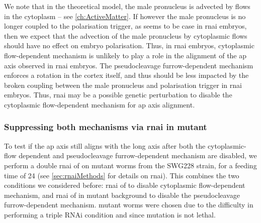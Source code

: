 We note that in the theoretical model, the male pronucleus is advected by flows in the cytoplasm -- see \autoref{ch:ActiveMatter}. If however the male pronucleus is no longer coupled to the polarisation trigger, as seems to be case in  \ac{rnai} embryos, then we expect that the advection of the male pronucleus by cytoplasmic flows should have no effect on embryo polarisation. Thus, in  \ac{rnai} embryos, cytoplasmic flow-dependent mechanism is unlikely to play a role in the alignment of the \ac{ap} axis observed in  \ac{rnai} embryos. The pseudocleavage furrow-dependent mechanism enforces a rotation in the cortex itself, and thus should be less impacted by the broken coupling between the male pronucleus and polarisation trigger in 
\ac{rnai} embryos. Thus,  \ac{rnai} may be a possible genetic perturbation to disable the cytoplasmic flow-dependent mechanism for \ac{ap} axis alignment.



\subsubsection{Suppressing both mechanisms via  \ac{rnai} in  mutant}
To test if the \ac{ap} axis still aligns with the long axis after both the cytoplasmic-flow dependent and pseudocleavage furrow-dependent mechanism are disabled, we perform a double \ac{rnai} of  on  mutant worms from the SWG228 strain, for a feeding time of \SI{24}{\unitRNAiTime} (see \autoref{sec:rnaiMethods} for details on \ac{rnai}). This combines the two conditions we considered before: \ac{rnai} of  to disable cytoplasmic flow-dependent mechanism, and \ac{rnai} of  in  mutant background to disable the pseudocleavage furrow-dependent mechanism.  mutant worms were chosen due to the difficulty in performing a triple RNAi condition and since  mutation is not lethal.


